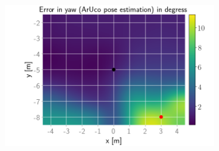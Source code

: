 \documentclass[../Head/report.tex]{subfiles}
\begin{document}
\begin{figure}[H]
    \hspace{-0.9em}
    \begin{subfigure}[t]{.337\textwidth}
        \centering
        \includegraphics[width=\textwidth]{../Figures/GPS2Vision_pose_estimation_test/test1_aruco_board_width_0.2_space_0.1/aruco_pose_estimation_error_yaw.png}
        \caption{}
        \label{fig:GPS2Vision_pose_estimation_test1_error_yaw}
    \end{subfigure}
    \caption{}
    \label{fig:GPS2Vision_pose_estimation_test1_error_ori}
\end{figure}
\end{document}
